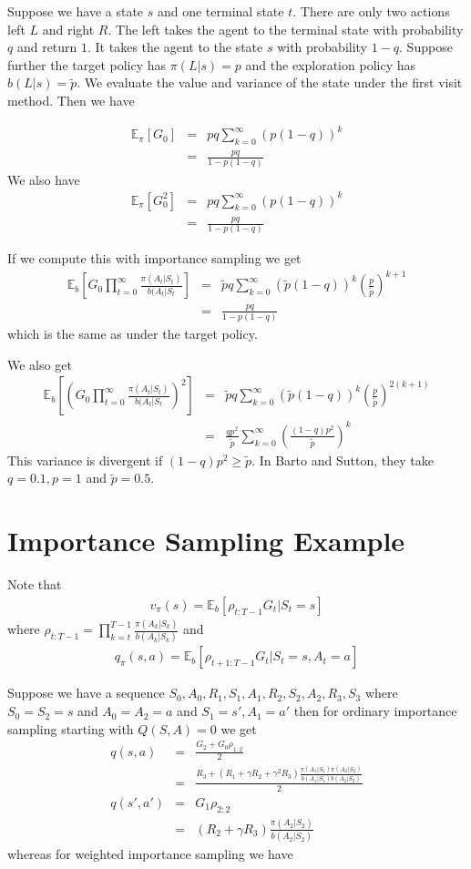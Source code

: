 \documentclass[11pt,a4paper]{article}
\newcommand\bea{\begin{eqnarray}}
\newcommand\eea{\end{eqnarray}}
\newcommand{\nn}{\nonumber \\}
\begin{document}
Suppose we have a state $s$ and one terminal state $t$. There are only two actions left $L$ and right $R$. The left takes the agent to the terminal state with probability $q$ and return $1$. It takes the agent to the state $s$ with probability $1-q$. Suppose further the target policy has $\pi(L|s)=p$ and the exploration policy has $b(L|s)=\tilde p$. We evaluate the value and variance of the state under the first visit method. Then we have

\bea
\mathbb E_\pi[G_0] &=& pq \sum_{k=0}^\infty (p (1-q))^k \nn
&=& \frac{pq}{1-p(1-q)}
\eea
We also have
\bea
\mathbb E_\pi[G_0^2] &=& pq \sum_{k=0}^\infty (p (1-q))^k \nn
&=& \frac{pq}{1-p(1-q)}
\eea

If we compute this with importance sampling we get
\bea
\mathbb E_b[G_0 \prod_{t=0}^\infty \frac{\pi(A_t|S_t)}{b(A_t|S_t}] &=& \tilde pq \sum_{k=0}^\infty (\tilde p (1-q))^k \left( \frac{p}{\tilde p} \right)^{k+1} \nn
&=& \frac{pq}{1-p(1-q)}
\eea
which is the same as under the target policy.

We also get
\bea
\mathbb E_b[\left(G_0 \prod_{t=0}^\infty \frac{\pi(A_t|S_t)}{b(A_t|S_t}\right)^2] &=& \tilde pq \sum_{k=0}^\infty (\tilde p (1-q))^k \left( \frac{p}{\tilde p} \right)^{2(k+1)} \nn
&=& \frac{qp^2}{\tilde p} \sum_{k=0}^\infty \left( \frac{(1-q) p^2}{\tilde p}\right)^k
\eea
This variance is divergent if $(1-q)p^2 \ge \tilde p$. In Barto and Sutton, they take $q=0.1, p=1$ and $\tilde p=0.5$.


\appendix

\section{Importance Sampling Example}
Note that
\bea
v_\pi(s) = \mathbb E_b [ \rho_{t:T-1} G_t | S_t=s]
\eea
where $\rho_{t:T-1} = \prod_{k=t}^{T-1} \frac{\pi(A_k|S_k)}{b(A_k|S_k)}$ and
\bea
q_\pi(s,a) = \mathbb E_b [ \rho_{t+1:T-1} G_t | S_t=s, A_t=a]
\eea


Suppose we have a sequence $S_0,A_0,R_1,S_1,A_1,R_2,S_2,A_2,R_3,S_3$ where $S_0=S_2=s$ and $A_0=A_2=a$ and $S_1=s',A_1=a'$ then for ordinary importance sampling starting with $Q(S,A)=0$ we get
\bea
q(s,a) &=& \frac{G_2 + G_0 \rho_{1:2}}{2} \nn
&=&  \frac{ R_3 + (R_1 + \gamma R_2 + \gamma^2 R_3) \frac{\pi(A_1|S_1)\pi(A_2|S_2)}{b(A_1|S_1)b(A_2|S_2)}}{2} \\
q(s',a') &=& G_1 \rho_{2:2} \nn
&=& (R_2 + \gamma R_3) \frac{\pi(A_2|S_2)}{b(A_2|S_2)}
\eea
whereas for weighted importance sampling we have
\end{document}
